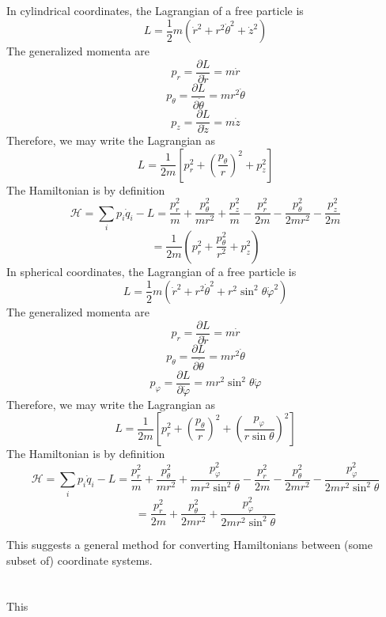 \documentclass{article}
\begin{document}
\section{}
In cylindrical coordinates, the Lagrangian of a free particle is
\[L=\frac{1}{2}m(\dot{r}^2+r^2\dot{\theta}^2+\dot{z}^2)\]
The generalized momenta are
\[p_r=\frac{\partial L}{\partial \dot{r}}=m\dot{r}\]
\[p_\theta=\frac{\partial L}{\partial \dot{\theta}}=mr^2\dot{\theta}\]
\[p_z=\frac{\partial L}{\partial\dot{z}}=m\dot{z}\]
Therefore, we may write the Lagrangian as
\[L=\frac{1}{2m}\left[ p_r^2+\left( \frac{p_\theta}{r} \right)^2+p_z^2 \right]\]
The Hamiltonian is by definition
\[\mathcal{H}=\sum_ip_i\dot{q}_i-L=\frac{p_r^2}{m}+\frac{p_\theta^2}{mr^2}+\frac{p_z^2}{m}-\frac{p_r^2}{2m}-\frac{p_\theta^2}{2mr^2}-\frac{p_z^2}{2m}\]
\[=\frac{1}{2m}\left( p_r^2+\frac{p_\theta^2}{r^2}+{p_z^2} \right)\]
In spherical coordinates, the Lagrangian of a free particle is
\[L=\frac{1}{2}m(\dot{r}^2+r^2\dot{\theta}^2+r^2\sin^2\theta\dot{\varphi}^2)\]
The generalized momenta are
\[p_r=\frac{\partial L}{\partial\dot{r} }=m\dot{r}\]
\[p_\theta=\frac{\partial L}{\partial\dot{\theta}}=mr^2\dot{\theta}\]
\[p_\varphi=\frac{\partial L}{\partial\dot{\varphi}}=mr^2\sin^2\theta\dot{\varphi}\]
Therefore, we may write the Lagrangian as
\[L=\frac{1}{2m}\left[  p_r^2+\left( \frac{p_\theta}{r} \right)^2+\left( \frac{p_\varphi}{r\sin\theta} \right)^2 \right]\]
The Hamiltonian is by definition
\[\mathcal{H}=\sum_ip_i\dot{q}_i-L=\frac{p_r^2}{m}+\frac{p_\theta^2}{mr^2}+\frac{p_\varphi^2}{mr^2\sin^2\theta}-\frac{p_r^2}{2m}-\frac{p_\theta^2}{2mr^2}-\frac{p_\varphi^2}{2mr^2\sin^2\theta}\]
\[=\frac{p_r^2}{2m}+\frac{p_\theta^2}{2mr^2}+\frac{p_\varphi^2}{2mr^2\sin^2\theta}\]

This suggests a general method for converting Hamiltonians between (some subset of) coordinate systems.

\section{}
This
\end{document}
